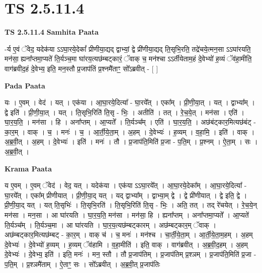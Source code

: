 \documentclass[17pt]{extarticle}
\begin{document}
\section{ TS 2.5.11.4 }

\textbf{TS 2.5.11.4 } \newline
\textbf{Samhita Paata} \newline

-र्य ए॒वं ॅवेद॒ यदेक॑या ऽऽघा॒रये॒देकां᳚ प्रीणीया॒द्यद् द्वाभ्यां॒ द्वे प्री॑णीया॒द्यद् ति॒सृभि॒रति॒ तद्रे॑चये॒त्मन॒सा ऽऽघा॑रयति॒ मन॑सा॒ ह्यना᳚प्तमा॒प्यते॑ ति॒र्यञ्च॒मा घा॑रय॒त्यछ॑म्बट्कारं॒ ॅवाक् च॒ मन॑श्चा ऽऽर्तीयेताम॒हं दे॒वेभ्यो॑ ह॒व्यं ॅव॑हा॒मीति॒ वाग॑ब्रवीद॒हं दे॒वेभ्य॒ इति॒ मन॒स्तौ प्र॒जाप॑तिं प्र॒श्नमै॑ताꣳ॒॒ सो᳚ऽब्रवीत् - [  ] \newline

\textbf{Pada Paata} \newline

यः । ए॒वम् । वेद॑ । यत् । एक॑या । आ॒घा॒रये॒दित्या᳚ - घा॒रये᳚त् । एका᳚म् । प्री॒णी॒या॒त् । यत् । द्वाभ्या᳚म् । द्वे इति॑ । प्री॒णी॒या॒त् । यत् । ति॒सृभि॒रिति॑ ति॒सृ - भिः॒ । अतीति॑ । तत् । रे॒च॒ये॒त् । मन॑सा । एति॑ । घा॒र॒य॒ति॒ । मन॑सा । हि । अना᳚प्तम् । आ॒प्यते᳚ । ति॒र्यञ्च᳚म् । एति॑ । घा॒र॒य॒ति॒ । अछ॑बंट्कार॒मित्यछ॑बंट् - का॒र॒म् । वाक् । च॒ । मनः॑ । च॒ । आ॒र्ती॒ये॒ता॒म् । अ॒हम् । दे॒वेभ्यः॑ । ह॒व्यम् । व॒हा॒मि॒ । इति॑ । वाक् । अ॒ब्र॒वी॒त् । अ॒हम् । दे॒वेभ्यः॑ । इति॑ । मनः॑ । तौ । प्र॒जाप॑ति॒मिति॑ प्र॒जा - प॒ति॒म् । प्र॒श्नम् । ऐ॒ता॒म् । सः । अ॒ब्र॒वी॒त् ।  \newline


\textbf{Krama Paata} \newline

य ए॒वम् । ए॒वम् ॅवेद॑ । वेद॒ यत् । यदेक॑या । एक॑या ऽऽघा॒रये᳚त् । आ॒घा॒रये॒देका᳚म् । आ॒घा॒रये॒दित्या᳚ - घा॒रये᳚त् । एका᳚म् प्रीणीयात् । प्री॒णी॒या॒द् यत् । यद् द्वाभ्या᳚म् । द्वाभ्या॒म् द्वे । द्वे प्री॑णीयात् । द्वे इति॒ द्वे । प्री॒णी॒या॒द् यत् । यत् ति॒सृभिः॑ । ति॒सृभि॒रति॑ । ति॒सृभि॒रिति॑ ति॒सृ - भिः॒ । अति॒ तत् । तद् रे॑चयेत् । रे॒च॒ये॒न् मन॑सा । मन॒सा । आ घा॑रयति । घा॒र॒य॒ति॒ मन॑सा । मन॑सा॒ हि । ह्यना᳚प्तम् । अना᳚प्तमा॒प्यते᳚ । आ॒प्यते॑ ति॒र्यञ्च᳚म् । ति॒र्यञ्च॒मा । आ घा॑रयति । घा॒र॒य॒त्यछ॑म्बट्कारम् । अछ॑म्बट्कार॒म् ॅवाक् । अछ॑म्बट्कार॒मित्यछ॑म्बट् - का॒र॒म् । वाक् च॑ । च॒ मनः॑ । मन॑श्च । चा॒र्ती॒ये॒ता॒म् । आ॒र्ती॒ये॒ता॒म॒हम् । अ॒हम् दे॒वेभ्यः॑ । दे॒वेभ्यो॑ ह॒व्यम् । ह॒व्यम् ॅव॑हामि । व॒हा॒मीति॑ । इति॒ वाक् । वाग॑ब्रवीत् । अ॒ब्र॒वी॒द॒हम् । अ॒हम् दे॒वेभ्यः॑ । दे॒वेभ्य॒ इति॑ । इति॒ मनः॑ । मन॒ स्तौ । तौ प्र॒जाप॑तिम् । प्र॒जाप॑तिम् प्र॒श्ञम् । प्र॒जाप॑ति॒मिति॑ प्र॒जा - प॒ति॒म् । प्र॒श्ञमै॑ताम् । ऐ॒ताꣳ॒॒ सः । सो᳚ऽब्रवीत् । अ॒ब्र॒वी॒त् प्र॒जाप॑तिः \newline
\end{document}

